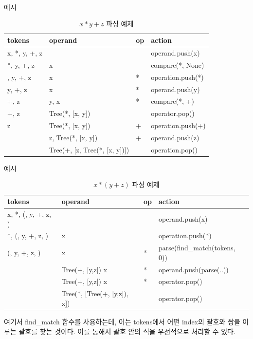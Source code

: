 \documentclass{beamer}
\begin{document}
\begin{frame}{예시}
\begin{table}[]
\centering
\caption{$x*y+z$ 파싱 예제}
\label{my-label}
\begin{tabular}{|l|l|l|l|}
\hline
tokens & operand  & op  & action \\ \hline
x, *, y, +, z &     &  & operand.push(x)     \\ \hline
*, y, +, z &  x   &  & compare(*, None)     \\ \hline
, y, +, z &  x   & * & operation.push(*)    \\ \hline
y, +, z &  x   & * & operand.push(y)     \\ \hline
+, z &  y, x  & * & compare(*, +)     \\ \hline
+, z &  Tree(*, [x, y])   &  & operator.pop()     \\ \hline
z &  Tree(*, [x, y])   & + & operation.push(+)     \\ \hline
&  z, Tree(*, [x, y])   & + & operand.push(z)     \\ \hline
&  Tree(+, [z, Tree(*, [x, y])])   &  & operation.pop()     \\ \hline
\end{tabular}
\end{table}


\end{frame}



\begin{frame}{예시}

\begin{table}[]
\centering
\caption{$x*(y+z)$ 파싱 예제}
\label{my-label}
\begin{tabular}{|l|l|l|l|}
\hline
tokens & operand  & op  & action \\ \hline
x, *, (,  y, +, z, )&     &  & operand.push(x)     \\ \hline
*, (,  y, +, z, )&  x  &  & operation.push(*)     \\ \hline
(,  y, +, z, )&  x  & * & parse(find\_match(tokens, 0))     \\ \hline
 &  Tree(+, [y,z]) x  & * & operand.push(parse(..))     \\ \hline
 &  Tree(+, [y,z]) x  & * & operator.pop()     \\ \hline
 &  Tree(*, [Tree(+, [y,z]), x])  &  & operator.pop()     \\ \hline
\end{tabular}
\end{table}

여기서 find\_match 함수를 사용하는데, 이는 tokens에서 어떤 index의 괄호와 쌍을 이루는 괄호를 찾는 것이다. 이를 통해서 괄호 안의 식을 우선적으로 처리할 수 있다. 

\end{frame}
\end{document}
